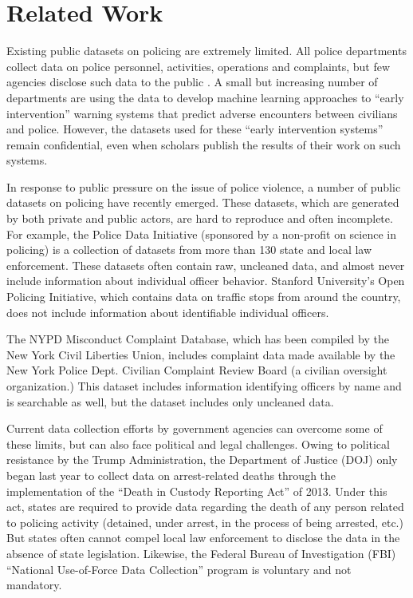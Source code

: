 \section{Related Work}\label{sec:related}

Existing public datasets on policing are extremely limited. All police
departments collect data on police personnel, activities, operations and
complaints, but few agencies disclose such data to the public \cite{Jackman21}.
A small but increasing number of departments are using the data to develop
machine learning approaches to “early intervention” warning systems that
predict adverse encounters between civilians and police. However, the datasets
used for these “early intervention systems” remain confidential, even when
scholars publish the results of their work on such systems.

In response to public pressure on the issue of police violence, a number of
public datasets on policing have recently emerged. These datasets, which are
generated by both private and public actors, are hard to reproduce and often
incomplete. For example, the Police Data Initiative (sponsored by a non-profit
on science in policing) is a collection of datasets from more than 130 state
and local law enforcement. These datasets often contain raw, uncleaned data,
and almost never include information about individual officer behavior.
Stanford University’s Open Policing Initiative, which contains data on traffic
stops from around the country, does not include information about identifiable
individual officers.

The NYPD Misconduct Complaint Database, which has been compiled by the New York
Civil Liberties Union, includes complaint data made available by the New York
Police Dept. Civilian Complaint Review Board (a civilian oversight
organization.) This dataset includes information identifying officers by name
and is searchable as well, but the dataset includes only uncleaned data.
 
Current data collection efforts by government agencies can overcome some of
these limits, but can also face political and legal challenges. Owing to
political resistance by the Trump Administration, the Department of Justice
(DOJ) only began last year to collect data on arrest-related deaths through the
implementation of the ``Death in Custody Reporting Act'' of 2013. Under this
act, states are required to provide data regarding the death of any person
related to policing activity (detained, under arrest, in the process of being
arrested, etc.) But states often cannot compel local law enforcement to
disclose the data in the absence of state legislation. Likewise, the Federal
Bureau of Investigation (FBI) ``National Use-of-Force Data Collection'' program
is voluntary and not mandatory.

